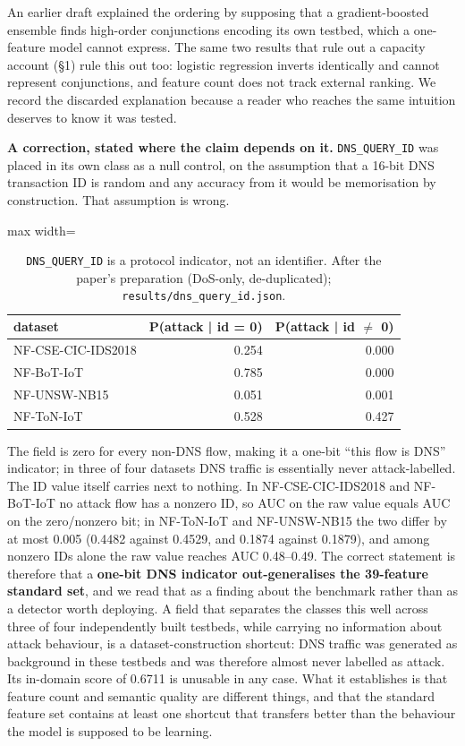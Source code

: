 \documentclass[preprint,12pt]{elsarticle}
\begin{document}
An earlier draft explained the ordering by supposing that a gradient-boosted ensemble finds high-order conjunctions encoding its own testbed, which a one-feature model cannot express. The same two results that rule out a capacity account (\S{}1) rule this out too: logistic regression inverts identically and cannot represent conjunctions, and feature count does not track external ranking. We record the discarded explanation because a reader who reaches the same intuition deserves to know it was tested.

\textbf{A correction, stated where the claim depends on it.} \texttt{DNS\_QUERY\_ID} was placed in its own class as a null control, on the assumption that a 16-bit DNS transaction ID is random and any accuracy from it would be memorisation by construction. That assumption is wrong.

\begin{table}[htbp]\centering\scriptsize
\caption{\texttt{DNS\_QUERY\_ID} is a protocol indicator, not an identifier. After the paper's preparation (DoS-only, de-duplicated); \texttt{results/dns\_query\_id.json}.}
\begin{adjustbox}{max width=\textwidth}\begin{tabular}{lrr}
\toprule
dataset & P(attack | id = 0) & P(attack | id \ensuremath{\neq} 0) \\
\midrule
NF-CSE-CIC-IDS2018 & 0.254 & 0.000 \\
NF-BoT-IoT & 0.785 & 0.000 \\
NF-UNSW-NB15 & 0.051 & 0.001 \\
NF-ToN-IoT & 0.528 & 0.427 \\
\bottomrule
\end{tabular}\end{adjustbox}
\end{table}

The field is zero for every non-DNS flow, making it a one-bit ``this flow is DNS'' indicator; in three of four datasets DNS traffic is essentially never attack-labelled. The ID value itself carries next to nothing. In NF-CSE-CIC-IDS2018 and NF-BoT-IoT no attack flow has a nonzero ID, so AUC on the raw value equals AUC on the zero/nonzero bit; in NF-ToN-IoT and NF-UNSW-NB15 the two differ by at most 0.005 (0.4482 against 0.4529, and 0.1874 against 0.1879), and among nonzero IDs alone the raw value reaches AUC 0.48--0.49. The correct statement is therefore that a \textbf{one-bit DNS indicator out-generalises the 39-feature standard set}, and we read that as a finding about the benchmark rather than as a detector worth deploying. A field that separates the classes this well across three of four independently built testbeds, while carrying no information about attack behaviour, is a dataset-construction shortcut: DNS traffic was generated as background in these testbeds and was therefore almost never labelled as attack. Its in-domain score of 0.6711 is unusable in any case. What it establishes is that feature count and semantic quality are different things, and that the standard feature set contains at least one shortcut that transfers better than the behaviour the model is supposed to be learning.
\end{document}
